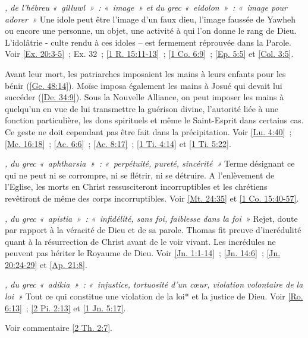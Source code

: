 \begin{multicols}{2}
\textit{, de l'hébreu «~gilluwl~»~: «~image~» et du grec «~eidolon~»~: «~image pour adorer~»}\newline
Une idole peut être l'image d'un faux dieu, l'image faussée de Yawheh ou encore une personne, un objet, une activité à qui l'on donne le rang de Dieu. L'idolâtrie - culte rendu à ces idoles – est fermement réprouvée dans la Parole. Voir \vref{Ex. 20:3-5}~; Ex. 32~; \vref{1 R. 15:11-13}~; \vref{1 Co. 6:9}~; \vref{Ep. 5:5} et \vref{Col. 3:5}.

\textit{}\newline
Avant leur mort, les patriarches imposaient les mains à leurs enfants pour les bénir (\vref{Ge. 48:14}). Moïse imposa également les mains à Josué qui devait lui succéder (\vref{De. 34:9}). Sous la Nouvelle Alliance, on peut imposer les mains à quelqu'un en vue de lui transmettre la guérison divine, l'autorité liée à une fonction particulière, les dons spirituels et même le Saint-Esprit dans certains cas. Ce geste ne doit cependant pas être fait dans la précipitation. Voir \vref{Lu. 4:40}~; \vref{Mc. 16:18}~; \vref{Ac. 6:6}~; \vref{Ac. 8:17}~; \vref{1 Ti. 4:14} et \vref{1 Ti. 5:22}.

\textit{, du grec «~aphtharsia~»~: «~perpétuité, pureté, sincérité~»}\newline
Terme désignant ce qui ne peut ni se corrompre, ni se flétrir, ni se détruire. A l'enlèvement de l'Eglise, les morts en Christ ressusciteront incorruptibles et les chrétiens revêtiront de même des corps incorruptibles. Voir \vref{Mt. 24:35} et \vref{1 Co. 15:40-57}.

\textit{, du grec «~apistia~»~: «~infidélité, sans foi, faiblesse dans la foi~»}\newline
Rejet, doute par rapport à la véracité de Dieu et de sa parole. Thomas fit preuve d'incrédulité quant à la résurrection de Christ avant de le voir vivant. Les incrédules ne peuvent pas hériter le Royaume de Dieu. Voir \vref{Jn. 1:1-14}~; \vref{Jn. 14:6}~; \vref{Jn. 20:24-29} et \vref{Ap. 21:8}.

\textit{, du grec «~adikia~»~: «~injustice, tortuosité d'un cœur, violation volontaire de la loi~»}\newline
Tout ce qui constitue une violation de la loi* et la justice de Dieu. Voir \vref{Ro. 6:13}~; \vref{2 Pi. 2:13} et \vref{1 Jn. 5:17}.

\textit{}\newline
Voir commentaire \vref{2 Th. 2:7}.


\end{multicols}
